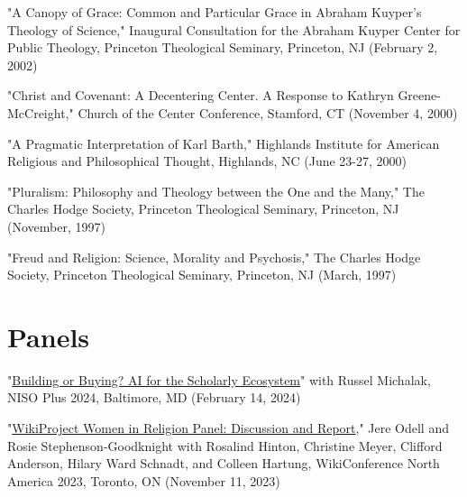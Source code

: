 \documentclass[]{res} %
\begin{document}
\begin{resume}
\begin{hangparas}{.25in}{1}"A Canopy of Grace: Common and Particular Grace in Abraham Kuyper’s Theology of Science," Inaugural Consultation for the Abraham Kuyper Center for Public Theology, Princeton Theological Seminary, Princeton, NJ (February 2, 2002)\end{hangparas}

\begin{hangparas}{.25in}{1}"Christ and Covenant: A Decentering Center. A Response to Kathryn Greene-McCreight," Church of the Center Conference, Stamford, CT (November 4, 2000)\end{hangparas}

\begin{hangparas}{.25in}{1}"A Pragmatic Interpretation of Karl Barth," Highlands Institute for American Religious and Philosophical Thought, Highlands, NC (June 23-27, 2000)\end{hangparas}

\begin{hangparas}{.25in}{1}"Pluralism: Philosophy and Theology between the One and the Many," The Charles Hodge Society, Princeton Theological Seminary, Princeton, NJ (November, 1997)\end{hangparas}

\begin{hangparas}{.25in}{1}"Freud and Religion: Science, Morality and Psychosis," The Charles Hodge Society, Princeton Theological Seminary, Princeton, NJ (March, 1997)\end{hangparas}

\section{Panels}

\begin{hangparas}{.25in}{1}"\href{https://nisoplusbaltimore24.sched.com/event/1UZGe/building-or-buying-ai-for-the-scholarly-ecosystem}{Building or Buying? AI for the Scholarly Ecosystem}" with Russel Michalak, NISO Plus 2024, Baltimore, MD (February 14, 2024)\end{hangparas}

\begin{hangparas}{.25in}{1}"\href{https://wikiconference.org/wiki/Submissions:2023/WikiProject_Women_in_Religion_Panel_Discussion_and_Report}{WikiProject Women in Religion Panel: Discussion and Report}," Jere Odell and Rosie Stephenson-Goodknight with Rosalind Hinton, Christine Meyer, Clifford Anderson, Hilary Ward Schnadt, and Colleen Hartung, WikiConference North America 2023, Toronto, ON (November 11, 2023)\end{hangparas}


\end{resume}
\end{document}

